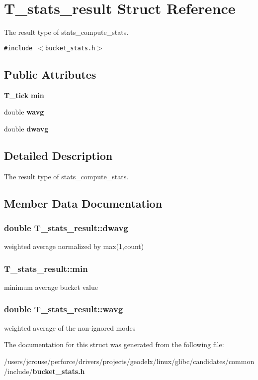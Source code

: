 \section{T\_\-stats\_\-result Struct Reference}
\label{structT__stats__result}
The result type of stats\_\-compute\_\-stats. 


{\tt \#include $<$bucket\_\-stats.h$>$}

\subsection*{Public Attributes}
\begin{CompactItemize}
\item 
{\bf T\_\-tick} {\bf min}
\item 
double {\bf wavg}
\item 
double {\bf dwavg}
\end{CompactItemize}


\subsection{Detailed Description}
The result type of stats\_\-compute\_\-stats.



\subsection{Member Data Documentation}
\subsubsection{\setlength{\rightskip}{0pt plus 5cm}double T\_\-stats\_\-result::dwavg}\label{structT__stats__result_m2}


weighted average normalized by max(1,count) 
\subsubsection{ T\_\-stats\_\-result::min}\label{structT__stats__result_m0}


minimum average bucket value 
\subsubsection{\setlength{\rightskip}{0pt plus 5cm}double T\_\-stats\_\-result::wavg}\label{structT__stats__result_m1}


weighted average of the non-ignored modes 

The documentation for this struct was generated from the following file:\begin{CompactItemize}
\item 
/users/jcrouse/perforce/drivers/projects/geodelx/linux/glibc/candidates/common/include/{\bf bucket\_\-stats.h}\end{CompactItemize}
